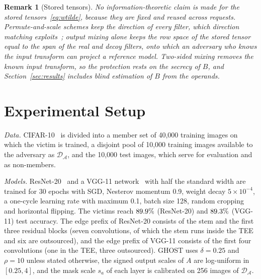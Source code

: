 \documentclass[lettersize,journal]{IEEEtran}
\newtheorem{remark}{Remark}
\begin{document}
\begin{remark}[Stored tensors]
\label{rem:weights}
No information-theoretic claim is made for the stored tensors~\eqref{eq:wtilde}, because they are fixed and reused across requests. Permute-and-scale schemes keep the direction of every filter, which direction matching exploits~\cite{wang2025arrows}; output mixing alone keeps the row space of the stored tensor equal to the span of the real and decoy filters, onto which an adversary who knows the input transform can project a reference model. Two-sided mixing removes the known input transform, so the protection rests on the secrecy of $B$, and Section~\ref{sec:results} includes blind estimation of $B$ from the operands.
\end{remark}

\section{Experimental Setup}
\label{sec:setup}
\emph{Data.} CIFAR-10~\cite{cifar10} is divided into a member set of 40{,}000 training images on which the victim is trained, a disjoint pool of 10{,}000 training images available to the adversary as $\mathcal{D}_{\mathcal{A}}$, and the 10{,}000 test images, which serve for evaluation and as non-members.

\emph{Models.} ResNet-20~\cite{he2016resnet} and a VGG-11 network~\cite{simonyan2015vgg} with half the standard width are trained for 30 epochs with SGD, Nesterov momentum 0.9, weight decay $5\times10^{-4}$, a one-cycle learning rate with maximum 0.1, batch size 128, random cropping and horizontal flipping. The victims reach $89.9\%$ (ResNet-20) and $89.3\%$ (VGG-11) test accuracy. The edge prefix of ResNet-20 consists of the stem and the first three residual blocks (seven convolutions, of which the stem runs inside the TEE and six are outsourced), and the edge prefix of VGG-11 consists of the first four convolutions (one in the TEE, three outsourced). GHOST uses $\delta=0.25$ and $\rho=10$ unless stated otherwise, the signed output scales of $A$ are log-uniform in $[0.25,4]$, and the mask scale $s_a$ of each layer is calibrated on 256 images of $\mathcal{D}_{\mathcal{A}}$.
\end{document}
